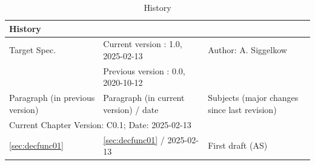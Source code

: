 \begin{table}[H]
\caption{History}
\label{tab:dechistory02}
\centering
\begin{tabularx}{\textwidth}{|X |X |X |}
  \hline
  \multicolumn{3}{|l|}{History} \\
  \hline
  \multicolumn{1}{|l}{Target Spec.} & \multicolumn{1}{l}{Current version : 1.0, 2025-02-13} & \multicolumn{1}{l|}{Author: A. Siggelkow}\\
  \multicolumn{1}{|l}{ } & \multicolumn{1}{l}{Previous version : 0.0, 2020-10-12} & \multicolumn{1}{l|}{ }\\
  \hline
  \hline
  Paragraph (in previous version) & Paragraph (in current version) / date & Subjects (major changes since last revision) \\
  \hline
  \hline
  \multicolumn{3}{|l|}{Current Chapter Version: C0.1; Date: 2025-02-13} \\
  \hline
  \ref{sec:decfunc01} & \ref{sec:decfunc01} / 2025-02-13 & First draft (AS) \\
  \hline
\end{tabularx}
\end{table}
